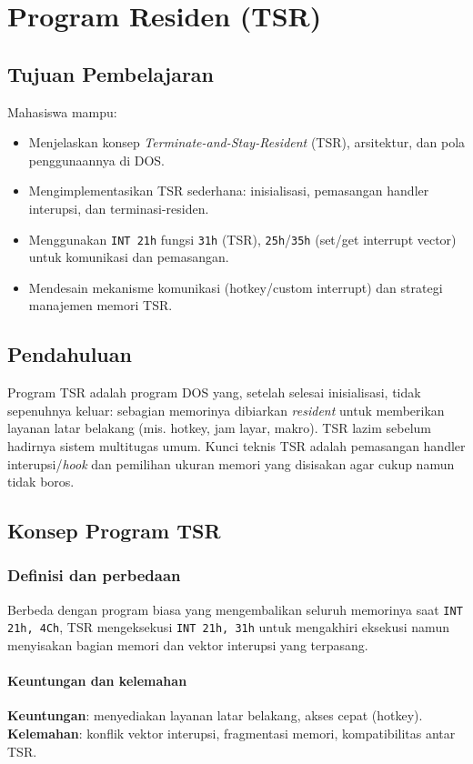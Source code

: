 \chapter{Program Residen (TSR)}

\section{Tujuan Pembelajaran}
Mahasiswa mampu:
\begin{itemize}
    \item Menjelaskan konsep \textit{Terminate-and-Stay-Resident} (TSR), arsitektur, dan pola penggunaannya di DOS.
    \item Mengimplementasikan TSR sederhana: inisialisasi, pemasangan handler interupsi, dan terminasi-residen.
    \item Menggunakan \texttt{INT 21h} fungsi \texttt{31h} (TSR), \texttt{25h}/\texttt{35h} (set/get interrupt vector) untuk komunikasi dan pemasangan.
    \item Mendesain mekanisme komunikasi (hotkey/custom interrupt) dan strategi manajemen memori TSR.
\end{itemize}

\section{Pendahuluan}
Program TSR adalah program DOS yang, setelah selesai inisialisasi, tidak sepenuhnya keluar: sebagian memorinya dibiarkan \textit{resident} untuk memberikan layanan latar belakang (mis. hotkey, jam layar, makro). TSR lazim sebelum hadirnya sistem multitugas umum. Kunci teknis TSR adalah pemasangan handler interupsi/\textit{hook} dan pemilihan ukuran memori yang disisakan agar cukup namun tidak boros.

\section{Konsep Program TSR}
\subsection{Definisi dan perbedaan}
Berbeda dengan program biasa yang mengembalikan seluruh memorinya saat \texttt{INT 21h, 4Ch}, TSR mengeksekusi \texttt{INT 21h, 31h} untuk mengakhiri eksekusi namun menyisakan bagian memori dan vektor interupsi yang terpasang.

\subsubsection{Keuntungan dan kelemahan}
\textbf{Keuntungan}: menyediakan layanan latar belakang, akses cepat (hotkey). \textbf{Kelemahan}: konflik vektor interupsi, fragmentasi memori, kompatibilitas antar TSR.

